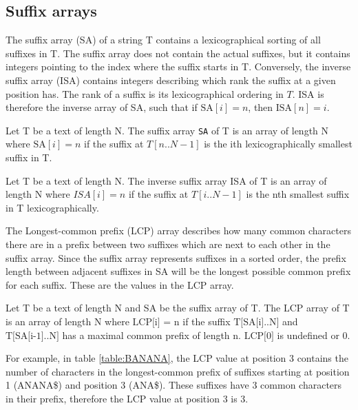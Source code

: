 \subsection*{Suffix arrays}

The suffix array (SA) of a string T contains a lexicographical sorting of all suffixes in
T. The suffix array does not contain the actual suffixes, but it contains integers
pointing to the index where the suffix starts in T. Conversely, the inverse suffix array
(ISA) contains integers describing which rank the suffix at a given position has. The rank
of a suffix is its lexicographical ordering in $T$. ISA is therefore the inverse array
of SA, such that if $\text{SA}[i] = n$, then $\text{ISA}[n] = i$.

\begin{definition} 
    Let T be a text of length N.
    The suffix array \texttt{SA} of T is an array of length N where $\text{SA}[i] = n$ if the
    suffix at $T[n..N-1]$ is the ith lexicographically smallest suffix in T.
\end{definition}

\begin{definition} 
    Let T be a text of length N.
    The inverse suffix array ISA of T is an array of length N where $ISA[i] = n$ if the
    suffix at $T[i..N-1]$ is the nth smallest suffix in T lexicographically.
\end{definition}

The Longest-common prefix (LCP) array describes how many common characters there are in a
prefix between two suffixes which are next to each other in the suffix array. Since the
suffix array represents suffixes in a sorted order, the prefix length between adjacent
suffixes in SA will be the longest possible common prefix for each suffix. These are the
values in the LCP array.

\begin{definition}
    Let T be a text of length N and SA be the suffix array of T.
    The LCP array of T is an array of length N where $\text{LCP[i] = n}$ if the suffix
    $\text{T[SA[i]..N]}$ and $\text{T[SA[i-1]..N]}$ has a maximal common prefix of length
    $\text{n}$. $\text{LCP[0]}$ is undefined or {0}.
\end{definition}

For example, in table \ref{table:BANANA}, the LCP value at position 3 contains the number
of characters in the longest-common prefix of suffixes starting at position 1 (ANANA\$)
and position 3 (ANA\$). These suffixes have 3 common characters in their prefix, therefore
the LCP value at position 3 is 3.

